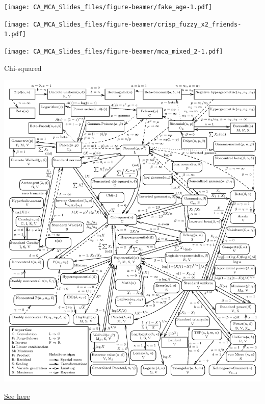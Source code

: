 \documentclass[
  ignorenonframetext,
]{beamer}
\begin{document}
\begin{frame}

\texttt{[image: CA\_MCA\_Slides\_files/figure-beamer/fake\_age-1.pdf]}

\end{frame}

\begin{frame}

\texttt{[image: CA\_MCA\_Slides\_files/figure-beamer/crisp\_fuzzy\_x2\_friends-1.pdf]}

\end{frame}

\begin{frame}

\texttt{[image: CA\_MCA\_Slides\_files/figure-beamer/mca\_mixed\_2-1.pdf]}

\end{frame}

\begin{frame}{Chi-squared}
\protect\hypertarget{chi-squared}{}

\includegraphics[width=\textwidth,height=0.75\textheight]{../images/distributions.png}

\href{http://www.math.wm.edu/~leemis/chart/UDR/UDR.html}{See here}

\end{frame}
\end{document}
